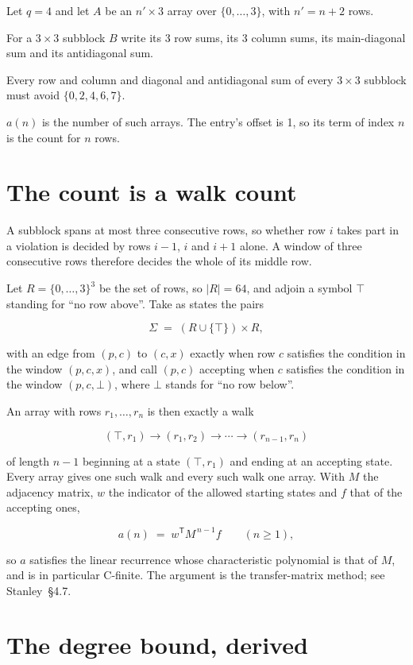 \documentclass[11pt]{article}
\theoremstyle{definition}
\begin{document}
Let $q = 4$ and let $A$ be an $n' \times 3$ array over $\{0,\dots,3\}$, with $n' = n + 2$ rows.

For a $3\times3$ subblock $B$ write its 3 row sums, its 3 column sums, its main-diagonal sum and its antidiagonal sum.

Every row and column and diagonal and antidiagonal sum of every $3\times3$ subblock must avoid $\{0, 2, 4, 6, 7\}$.

$a(n)$ is the number of such arrays. The entry's offset is 1, so its term of index $n$ is the count for $n$ rows.

\section{The count is a walk count}

A subblock spans at most three consecutive rows, so whether row $i$ takes part in a violation is decided by rows $i-1$, $i$ and $i+1$ alone. A window of three consecutive rows therefore decides the whole of its middle row.

Let $R = \{0,\dots,3\}^{3}$ be the set of rows, so $|R| = 64$, and adjoin a symbol $\top$ standing for ``no row above''. Take as states the pairs

\[\Sigma \;=\; (R \cup \{\top\}) \times R,\]

with an edge from $(p,c)$ to $(c,x)$ exactly when row $c$ satisfies the condition in the window $(p,c,x)$, and call $(p,c)$ accepting when $c$ satisfies the condition in the window $(p,c,\bot)$, where $\bot$ stands for ``no row below''.

An array with rows $r_1,\dots,r_n$ is then exactly a walk

\[(\top,r_1) \to (r_1,r_2) \to \cdots \to (r_{n-1},r_n)\]

of length $n-1$ beginning at a state $(\top,r_1)$ and ending at an accepting state. Every array gives one such walk and every such walk one array. With $M$ the adjacency matrix, $w$ the indicator of the allowed starting states and $f$ that of the accepting ones,

\[a(n) \;=\; w^{\mathsf T} M^{\,n-1} f \qquad (n \ge 1),\]

so $a$ satisfies the linear recurrence whose characteristic polynomial is that of $M$, and is in particular C-finite. The argument is the transfer-matrix method; see Stanley~\S4.7.

\section{The degree bound, derived}
\end{document}
